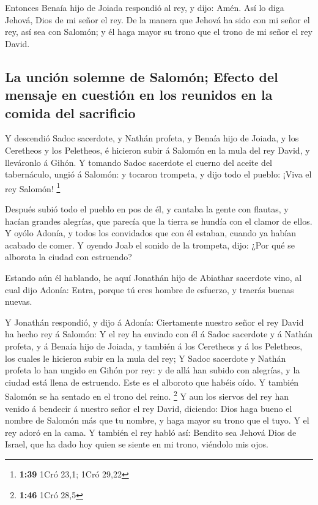  Entonces Benaía hijo de Joiada respondió al rey, y dijo:
Amén. Así lo diga Jehová, Dios de mi señor el rey.  De la
manera que Jehová ha sido con mi señor el rey, así sea con Salomón; y él
haga mayor su trono que el trono de mi señor el rey David.

\hypertarget{la-unciuxf3n-solemne-de-salomuxf3n-efecto-del-mensaje-en-cuestiuxf3n-en-los-reunidos-en-la-comida-del-sacrificio}{%
\subsection{La unción solemne de Salomón; Efecto del mensaje en cuestión
en los reunidos en la comida del
sacrificio}\label{la-unciuxf3n-solemne-de-salomuxf3n-efecto-del-mensaje-en-cuestiuxf3n-en-los-reunidos-en-la-comida-del-sacrificio}}

 Y descendió Sadoc sacerdote, y Nathán profeta, y Benaía
hijo de Joiada, y los Ceretheos y los Peletheos, é hicieron subir á
Salomón en la mula del rey David, y lleváronlo á Gihón.  Y
tomando Sadoc sacerdote el cuerno del aceite del tabernáculo, ungió á
Salomón: y tocaron trompeta, y dijo todo el pueblo: ¡Viva el rey
Salomón! \footnote{\textbf{1:39} 1Cró 23,1; 1Cró 29,22}

 Después subió todo el pueblo en pos de él, y cantaba la
gente con flautas, y hacían grandes alegrías, que parecía que la tierra
se hundía con el clamor de ellos.  Y oyólo Adonía, y todos
los convidados que con él estaban, cuando ya habían acabado de comer. Y
oyendo Joab el sonido de la trompeta, dijo: ¿Por qué se alborota la
ciudad con estruendo?

 Estando aún él hablando, he aquí Jonathán hijo de Abiathar
sacerdote vino, al cual dijo Adonía: Entra, porque tú eres hombre de
esfuerzo, y traerás buenas nuevas.

 Y Jonathán respondió, y dijo á Adonía: Ciertamente nuestro
señor el rey David ha hecho rey á Salomón:  Y el rey ha
enviado con él á Sadoc sacerdote y á Nathán profeta, y á Benaía hijo de
Joiada, y también á los Ceretheos y á los Peletheos, los cuales le
hicieron subir en la mula del rey;  Y Sadoc sacerdote y
Nathán profeta lo han ungido en Gihón por rey: y de allá han subido con
alegrías, y la ciudad está llena de estruendo. Este es el alboroto que
habéis oído.  Y también Salomón se ha sentado en el trono
del reino. \footnote{\textbf{1:46} 1Cró 28,5}  Y aun los
siervos del rey han venido á bendecir á nuestro señor el rey David,
diciendo: Dios haga bueno el nombre de Salomón más que tu nombre, y haga
mayor su trono que el tuyo. Y el rey adoró en la cama.  Y
también el rey habló así: Bendito sea Jehová Dios de Israel, que ha dado
hoy quien se siente en mi trono, viéndolo mis ojos.

